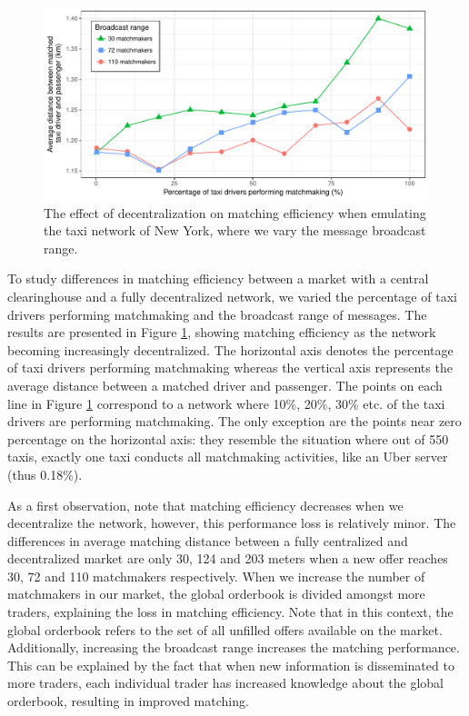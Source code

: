 \documentclass[USenglish]{article}
\begin{document}
\begin{figure}[t]
	\centering
	\includegraphics[width=1\columnwidth]{assets/matching_efficiency.pdf}
	\caption{The effect of decentralization on matching efficiency when emulating the taxi network of New York, where we vary the message broadcast range.}
	\label{fig:matching_efficiency}
\end{figure}

To study differences in matching efficiency between a market with a central clearinghouse and a fully decentralized network, we varied the percentage of taxi drivers performing matchmaking and the broadcast range of messages.
The results are presented in Figure \ref{fig:matching_efficiency}, showing matching efficiency as the network becoming increasingly decentralized.
The horizontal axis denotes the percentage of taxi drivers performing matchmaking whereas the vertical axis represents the average distance between a matched driver and passenger.
The points on each line in Figure \ref{fig:matching_efficiency} correspond to a network where 10\%, 20\%, 30\% etc. of the taxi drivers are performing matchmaking.
The only exception are the points near zero percentage on the horizontal axis: they resemble the situation where out of 550 taxis, exactly one taxi conducts all matchmaking activities, like an Uber server (thus 0.18\%).

As a first observation, note that matching efficiency decreases when we decentralize the network, however, this performance loss is relatively minor.
The differences in average matching distance between a fully centralized and decentralized market are only 30, 124 and 203 meters when a new offer reaches 30, 72 and 110 matchmakers respectively.
When we increase the number of matchmakers in our market, the global orderbook is divided amongst more traders, explaining the loss in matching efficiency.
Note that in this context, the global orderbook refers to the set of all unfilled offers available on the market.
Additionally, increasing the broadcast range increases the matching performance.
This can be explained by the fact that when new information is disseminated to more traders, each individual trader has increased knowledge about the global orderbook, resulting in improved matching.
\end{document}
